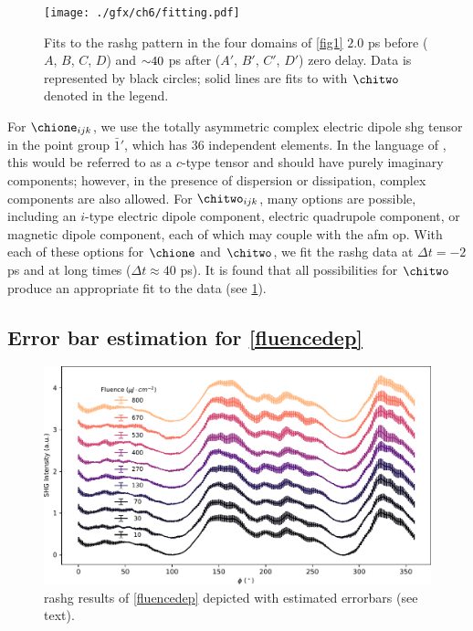 \begin{figure}
\centering
\texttt{[image: ./gfx/ch6/fitting.pdf]}
\caption{
\label{fitting}
Fits to the \gls{rashg} pattern in the four domains of \cref{fig1} $2.0$ \si{ps} before ($A$, $B$, $C$, $D$) and ${\sim} 40$ \si{ps} after ($A'$, $B'$, $C'$, $D'$) zero delay.
Data is represented by black circles; solid lines are fits to  with $\chitwo$ denoted in the legend.
}
\end{figure}

For $\chione_{ijk}$, we use the totally asymmetric complex electric dipole \gls{shg} tensor in the point group $\bar{1}'$, which has $36$ independent elements.
In the language of \citet{birss}, this would be referred to as a $c$-type tensor and should have purely imaginary components; however, in the presence of dispersion or dissipation, complex components are also allowed.
For $\chitwo_{ijk}$, many options are possible, including an $i$-type electric dipole component, electric quadrupole component, or magnetic dipole component, each of which may couple with the \gls{afm} \gls{op}.
With each of these options for $\chione$ and $\chitwo$, we fit the \gls{rashg} data at $\Delta t=-2$ \si{ps} and at long times ($\Delta t\approx 40$ \si{ps}).
It is found that all possibilities for $\chitwo$ produce an appropriate fit to the data (see \cref{fitting}).

\subsection{Error bar estimation for \cref{fluencedep}}

\begin{figure}
\centering
\includegraphics[width=\textwidth]{./gfx/ch6/errorbars.pdf}
\caption{\label{errorbars}\gls{rashg} results of \cref{fluencedep} depicted with estimated errorbars (see text).}
\end{figure}

